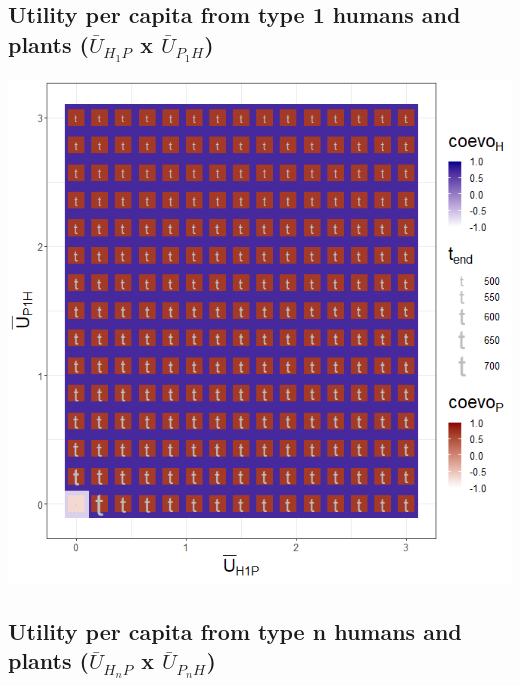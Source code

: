 \documentclass[
]{book}
\begin{document}
\newpage

\hypertarget{utility-per-capita-from-type-1-humans-and-plants-baru_h_1p-x-baru_p_1h}{%
\subsection{\texorpdfstring{Utility per capita from type 1 humans and plants (\(\bar{U}_{H_{1}P}\) x \(\bar{U}_{P_{1}H}\))}{Utility per capita from type 1 humans and plants (\textbackslash bar\{U\}\_\{H\_\{1\}P\} x \textbackslash bar\{U\}\_\{P\_\{1\}H\})}}\label{utility-per-capita-from-type-1-humans-and-plants-baru_h_1p-x-baru_p_1h}}


\includegraphics[width=1\linewidth]{plots/3_twoPar-mU.H1P-mU.P1H_plot}

\newpage

\hypertarget{utility-per-capita-from-type-n-humans-and-plants-baru_h_np-x-baru_p_nh-1}{%
\subsection{\texorpdfstring{Utility per capita from type n humans and plants (\(\bar{U}_{H_{n}P}\) x \(\bar{U}_{P_{n}H}\))}{Utility per capita from type n humans and plants (\textbackslash bar\{U\}\_\{H\_\{n\}P\} x \textbackslash bar\{U\}\_\{P\_\{n\}H\})}}\label{utility-per-capita-from-type-n-humans-and-plants-baru_h_np-x-baru_p_nh-1}}
\end{document}
